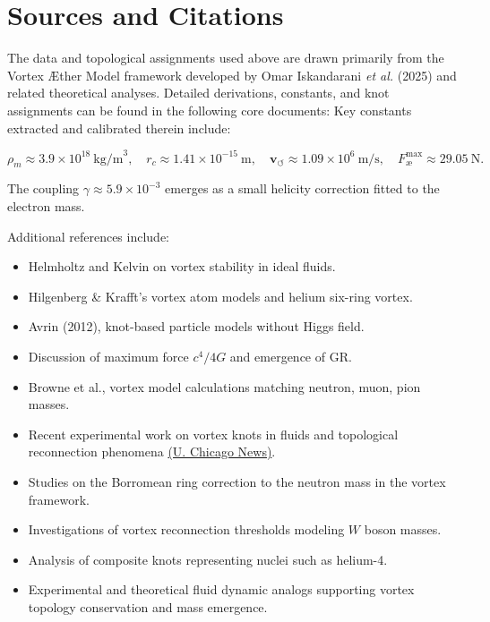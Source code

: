 \documentclass[11pt]{article}
\begin{document}
    \section*{Sources and Citations}

    The data and topological assignments used above are drawn primarily from the Vortex Æther Model framework developed by Omar Iskandarani \textit{et al.} (2025) and related theoretical analyses. Detailed derivations, constants, and knot assignments can be found in the following core documents:
    Key constants extracted and calibrated therein include:

    \[
        \rho_{\scriptscriptstyle\boldsymbol\!m} \approx 3.9 \times 10^{18}~\mathrm{kg/m}^3, \quad
        r_c \approx 1.41 \times 10^{-15}~\mathrm{m}, \quad
        \mathbf{v}_{\scriptscriptstyle\boldsymbol{\circlearrowleft}} \approx 1.09 \times 10^{6}~\mathrm{m/s}, \quad
        F^{\max}_{\text{\ae}} \approx 29.05~\mathrm{N}.
    \]

    The coupling $\gamma \approx 5.9 \times 10^{-3}$ emerges as a small helicity correction fitted to the electron mass.

    Additional references include:

    \vspace{-1em}

    \begin{itemize}
        \item Helmholtz and Kelvin on vortex stability in ideal fluids.
        \item Hilgenberg \& Krafft’s vortex atom models and helium six-ring vortex.
        \item Avrin (2012), knot-based particle models without Higgs field.
        \item Discussion of maximum force $c^4/4G$ and emergence of GR.
        \item Browne et al., vortex model calculations matching neutron, muon, pion masses.
        \item Recent experimental work on vortex knots in fluids and topological reconnection phenomena \href{https://news.uchicago.edu/story/vortex-loops-could-untie-knotty-physics-problems#:~:text=Vortex%20knots%20should%2C%20in%20principle%2C,%E2%80%9D}{(U. Chicago News)}.
    \end{itemize}

    \begin{itemize}
        \item Studies on the Borromean ring correction to the neutron mass in the vortex framework.
        \item Investigations of vortex reconnection thresholds modeling $W$ boson masses.
        \item Analysis of composite knots representing nuclei such as helium-4.
        \item Experimental and theoretical fluid dynamic analogs supporting vortex topology conservation and mass emergence.
    \end{itemize}
\end{document}
